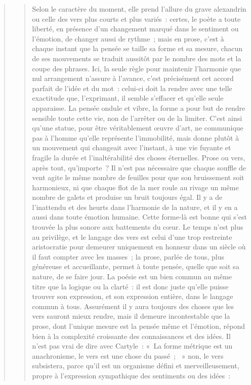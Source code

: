 \documentclass[french,twoside]{book} %
\begin{document}
\begin{verse}
\begin{verse}
Selon le caractère du moment, elle prend l’allure du grave alexandrin ou celle des vers plus courts et plus variés : certes, le poète a toute liberté, en présence d’un changement marqué dans le sentiment ou l’émotion, de changer aussi de rythme ; mais en prose, c’est à chaque instant que la pensée se taille sa forme et sa mesure, chacun de ses mouvements se traduit aussitôt par le nombre des mots et la coupe des phrases. Ici, la seule règle pour maintenir l’harmonie que nul arrangement n’assure à l’avance, c’est précisément cet accord parfait de l’idée et du mot : celui-ci doit la rendre avec une telle exactitude que, l’exprimant, il semble s’effacer et qu’elle seule apparaisse. La pensée ondule et vibre, la forme a pour but de rendre sensible toute cette vie, non de l’arrêter ou de la limiter. C’est ainsi qu’une statue, pour être véritablement œuvre d’art, ne communique pas à l’homme qu’elle représente l’immobilité, mais donne plutôt à un mouvement qui changeait avec l’instant, à une vie fuyante et fragile la durée et l’inaltérabilité des choses éternelles. Prose ou vers, après tout, qu’importe ? Il n’est pas nécessaire que chaque souffle de vent agite le même nombre de feuilles pour que son bruissement soit harmonieux, ni que chaque flot de la mer roule au rivage un même nombre de galets et produise un bruit toujours égal. Il y a de l’inattendu et des heurts dans l’harmonie de la nature, et il y en a aussi dans toute émotion humaine. Cette forme-là est bonne qui s’est trouvée la plus sonore aux battements du cœur. Le temps n’est plus au privilège, et le langage des vers est celui d’une trop restreinte aristocratie pour demeurer uniquement en honneur dans un siècle où il faut compter avec les masses ; la prose, parlée de tous, plus généreuse et accueillante, permet à toute pensée, quelle que soit sa nature, de se faire jour. La poésie est un bien commun au même titre que la logique ou la clarté : il est donc juste qu’elle puisse trouver son expression, et son expression entière, dans le langage commun à tous. Assurément il y aura toujours des choses que les vers sauront mieux rendre, mais il demeure incontestable que la prose, dont l’unique mesure est la pensée même et l’émotion, répond bien à la complexité croissante des connaissances et des idées. Il n’est pas vrai de dire avec Cartyle : « La forme métrique est un anachronisme, le vers est une chose du passé ;  » non, le vers subsistera, parce qu’il est un organisme défini et merveilleusement, propre à l’expression sympathique des sentiments ou des idées :\par



\end{verse}
\end{verse}
\end{document}
